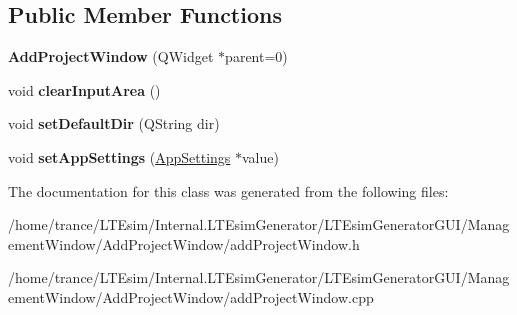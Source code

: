 \subsection*{Public Member Functions}
\begin{DoxyCompactItemize}
\item 
{\bfseries Add\+Project\+Window} (Q\+Widget $\ast$parent=0)\hypertarget{class_add_project_window_aa99d418a2a7aba20c9e41535d3d4e9cc}{}\label{class_add_project_window_aa99d418a2a7aba20c9e41535d3d4e9cc}

\item 
void {\bfseries clear\+Input\+Area} ()\hypertarget{class_add_project_window_a0c40ddf9f95f9aca2d6c705cd0edcdbf}{}\label{class_add_project_window_a0c40ddf9f95f9aca2d6c705cd0edcdbf}

\item 
void {\bfseries set\+Default\+Dir} (Q\+String dir)\hypertarget{class_add_project_window_a0c714f31adb731f0100396341bbd7498}{}\label{class_add_project_window_a0c714f31adb731f0100396341bbd7498}

\item 
void {\bfseries set\+App\+Settings} (\hyperlink{class_app_settings}{App\+Settings} $\ast$value)\hypertarget{class_add_project_window_ad4389df3a8c0d9e5172cf53745c3b5c1}{}\label{class_add_project_window_ad4389df3a8c0d9e5172cf53745c3b5c1}

\end{DoxyCompactItemize}


The documentation for this class was generated from the following files\+:\begin{DoxyCompactItemize}
\item 
/home/trance/\+L\+T\+Esim/\+Internal.\+L\+T\+Esim\+Generator/\+L\+T\+Esim\+Generator\+G\+U\+I/\+Management\+Window/\+Add\+Project\+Window/add\+Project\+Window.\+h\item 
/home/trance/\+L\+T\+Esim/\+Internal.\+L\+T\+Esim\+Generator/\+L\+T\+Esim\+Generator\+G\+U\+I/\+Management\+Window/\+Add\+Project\+Window/add\+Project\+Window.\+cpp\end{DoxyCompactItemize}
